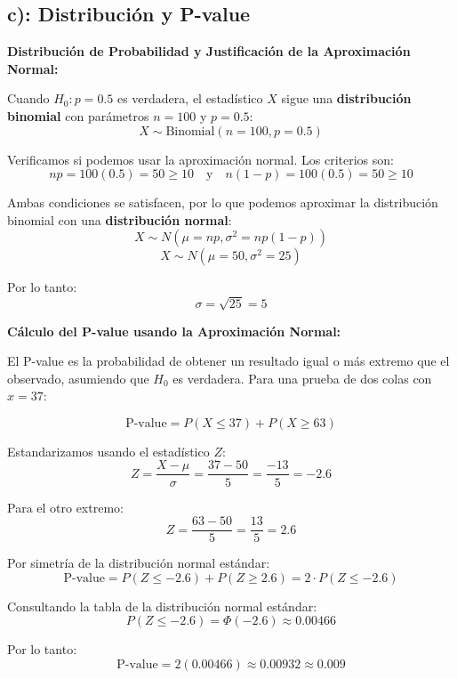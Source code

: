 \documentclass[12pt]{article}
\begin{document}
\subsection*{c): Distribución y P-value}

\textbf{Distribución de Probabilidad y Justificación de la Aproximación Normal:}

Cuando $H_0: p = 0.5$ es verdadera, el estadístico $X$ sigue una \textbf{distribución binomial} con parámetros $n = 100$ y $p = 0.5$:
$$X \sim \text{Binomial}(n=100, p=0.5)$$

Verificamos si podemos usar la aproximación normal. Los criterios son:
$$np = 100(0.5) = 50 \geq 10 \quad \text{y} \quad n(1-p) = 100(0.5) = 50 \geq 10$$

Ambas condiciones se satisfacen, por lo que podemos aproximar la distribución binomial con una \textbf{distribución normal}:
$$X \sim N(\mu = np, \sigma^2 = np(1-p))$$
$$X \sim N(\mu = 50, \sigma^2 = 25)$$

Por lo tanto:
$$\sigma = \sqrt{25} = 5$$

\textbf{Cálculo del P-value usando la Aproximación Normal:}

El P-value es la probabilidad de obtener un resultado igual o más extremo que el observado, asumiendo que $H_0$ es verdadera. Para una prueba de dos colas con $x = 37$:

$$\text{P-value} = P(X \leq 37) + P(X \geq 63)$$

Estandarizamos usando el estadístico $Z$:
$$Z = \frac{X - \mu}{\sigma} = \frac{37 - 50}{5} = \frac{-13}{5} = -2.6$$

Para el otro extremo:
$$Z = \frac{63 - 50}{5} = \frac{13}{5} = 2.6$$

Por simetría de la distribución normal estándar:
$$\text{P-value} = P(Z \leq -2.6) + P(Z \geq 2.6) = 2 \cdot P(Z \leq -2.6)$$

Consultando la tabla de la distribución normal estándar:
$$P(Z \leq -2.6) = \Phi(-2.6) \approx 0.00466$$

Por lo tanto:
$$\text{P-value} = 2(0.00466) \approx 0.00932 \approx 0.009$$
\end{document}
